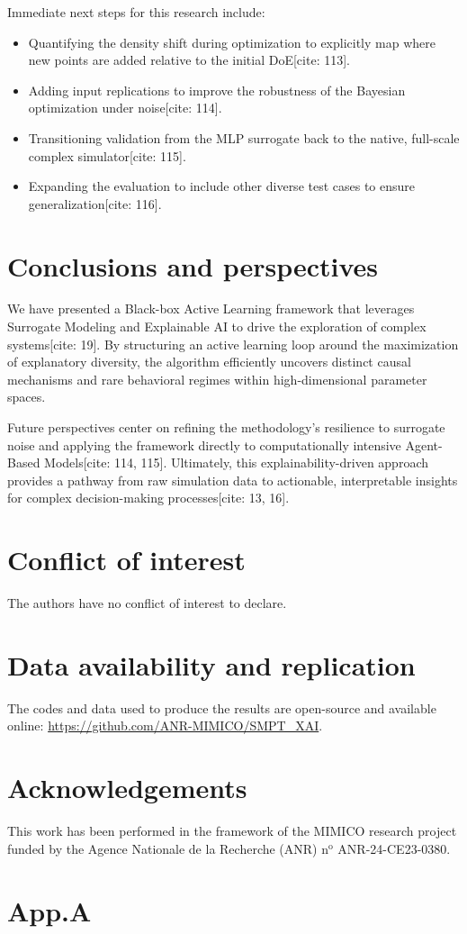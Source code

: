 \documentclass[sn-mathphys]{sn-jnl}
\theoremstyle{thmstyleone}%
\theoremstyle{thmstyletwo}%
\theoremstyle{thmstylethree}%
\begin{document}
Immediate next steps for this research include:
\begin{itemize}
    \item Quantifying the density shift during optimization to explicitly map where new points are added relative to the initial DoE[cite: 113].
    \item Adding input replications to improve the robustness of the Bayesian optimization under noise[cite: 114].
    \item Transitioning validation from the MLP surrogate back to the native, full-scale complex simulator[cite: 115].
    \item Expanding the evaluation to include other diverse test cases to ensure generalization[cite: 116].
\end{itemize}

\section{Conclusions and perspectives}
We have presented a Black-box Active Learning framework that leverages Surrogate Modeling and Explainable AI to drive the exploration of complex systems[cite: 19]. By structuring an active learning loop around the maximization of explanatory diversity, the algorithm efficiently uncovers distinct causal mechanisms and rare behavioral regimes within high-dimensional parameter spaces.

Future perspectives center on refining the methodology's resilience to surrogate noise and applying the framework directly to computationally intensive Agent-Based Models[cite: 114, 115]. Ultimately, this explainability-driven approach provides a pathway from raw simulation data to actionable, interpretable insights for complex decision-making processes[cite: 13, 16].

\section*{Conflict of interest}
The authors have no conflict of interest to declare.

\section*{Data availability and replication}
The codes and data used to produce the results are open-source and available online: {\url{https://github.com/ANR-MIMICO/SMPT_XAI}}.

\section*{Acknowledgements}
This work has been performed in the framework of the MIMICO research project funded by the Agence Nationale de la Recherche (ANR) n$^\text{o}$ ANR-24-CE23-0380. 




\appendix

\section{App.A}
\end{document}
